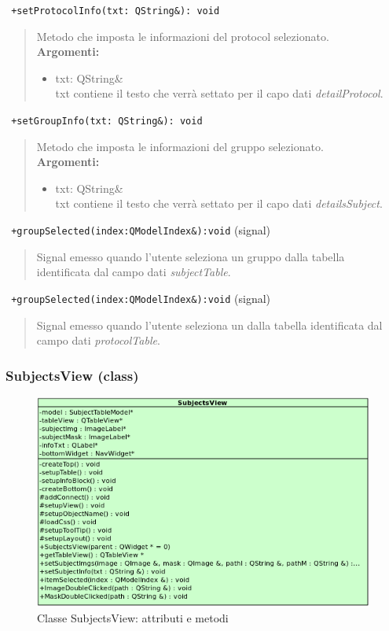 \color{blue}\verb! +setProtocolInfo(txt: QString&): void!
\begin{quote}
\color{black} Metodo che imposta le informazioni del protocol selezionato.  \\
 \textbf{Argomenti:}
 \begin{itemize}
 \item txt: QString\&\\ txt contiene il testo che verrà settato per il capo dati \emph{detailProtocol}.
 \end{itemize}
\end{quote}
\color{blue}\verb! +setGroupInfo(txt: QString&): void!
\begin{quote}
\color{black} Metodo che imposta le informazioni del gruppo selezionato.  \\
 \textbf{Argomenti:}
 \begin{itemize}
 \item txt: QString\&\\ txt contiene il testo che verrà settato per il capo dati \emph{detailsSubject}.
 \end{itemize}
\end{quote}
\color{blue}\verb! +groupSelected(index:QModelIndex&):void! (signal)
\color{black} 
\begin{quote}
Signal\g{} emesso quando l'utente seleziona un gruppo dalla tabella identificata dal campo dati \emph{subjectTable}.
\end{quote}
\color{blue}\verb! +groupSelected(index:QModelIndex&):void! (signal)
\color{black} 
\begin{quote}
Signal\g{} emesso quando l'utente seleziona un \protocol{} dalla tabella identificata dal campo dati \emph{protocolTable}.
\end{quote}
\pagebreak
\color{black}
\subsubsection{SubjectsView (class)}
\label{spesubV}
\begin{figure}[!h]
\centering
			\includegraphics[width=0.5\linewidth]{./Content/Immagini/view/SubjectsView.png}
			\caption{Classe SubjectsView: attributi e metodi}
			\label{cl_subview}
\end{figure}
